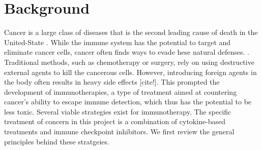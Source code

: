 \documentclass[11pt]{article}
\begin{document}
\section{Background}\label{sec:background}

\quad Cancer is a large class of diseases that is the second leading cause of death in the United-State \cite{nchs}. While the immune system has the potential to target and eliminate cancer cells, cancer often finds ways to evade hese natural defenses. \cite{EvasionMech}. Traditional methods, such as chemotherapy or surgery, rely on using destructive external agents to kill the cancerous cells. However, introducing foreign agents in the body often results in heavy side effects [cite!]. This prompted the development of immunotherapies, a type of treatment aimed at countering cancer's ability to escape immune detection, which thus has the potential to be less toxic. Several viable strategies exist for immunotherapy. The specific treatment of concern in this project is a combination of cytokine-based treatments and immune checkpoint inhibitors. We first review the general principles behind these stratgeies.

\end{document}
